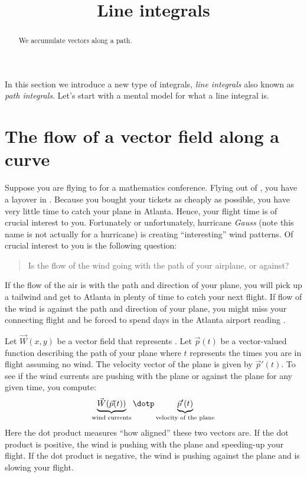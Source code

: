 \documentclass{ximera}
\title[Dig-In:]{Line integrals}
\begin{document}
\begin{abstract}
We accumulate vectors along a path.
\end{abstract}
\maketitle

In this section we introduce a new type of integrals, \textit{line
  integrals} also known as \textit{path integrals}. Let's start with a
mental model for what a line integral is.

\section{The flow of a vector field along a curve}

Suppose you are flying to  for a mathematics
conference. Flying out of , you have a layover in . Because
you bought your tickets as cheaply as possible, you have very little
time to catch your plane in Atlanta. Hence, your flight time is of crucial
interest to you. Fortunately or unfortunately, hurricane
\textit{Gauss} (note this name is not actually
for a hurricane) is creating ``interesting'' wind patterns. Of crucial
interest to you is the following question:
\begin{quote}
  Is the flow of the wind going with the path of your airplane, or
  against? 
\end{quote}
If the flow of the air is with the path and direction of your plane,
you will pick up a tailwind and get to Atlanta in plenty of time to
catch your next flight. If flow of the wind is against the path and
direction of your plane, you might miss your connecting flight and be
forced to spend days in the Atlanta airport reading .

Let $\vec{W}(x,y)$ be a vector field that represents . Let $\vec{p}(t)$ be a
vector-valued function describing the path of your plane where $t$
represents the times you are in flight assuming no wind.  The velocity
vector of the plane is given by $\vec{p}'(t)$. To see if the wind
currents are pushing with the plane or against the plane for any given
time, you compute:
\[
\underbrace{\vec{W}(\vec{p}(t))}_{\text{wind currents}}\dotp \underbrace{\vec{p}'(t)}_{\text{velocity of the plane}}
\]
Here the dot product measures ``how aligned'' these two vectors are.
If the dot product is positive, the wind is pushing with the plane and
speeding-up your flight. If the dot product is negative, the wind is
pushing against the plane and is slowing your flight.
\end{document}
